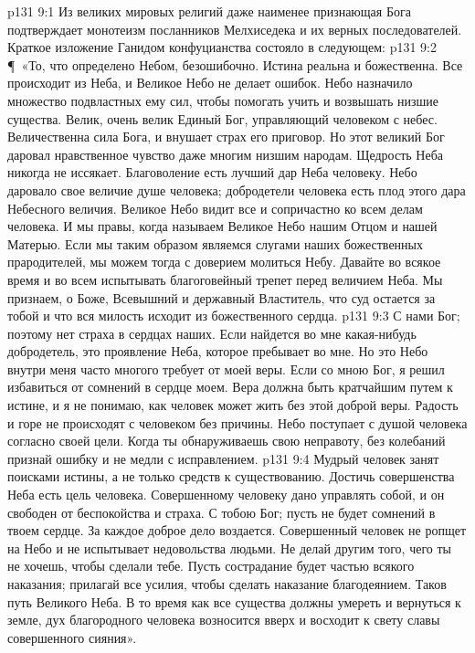 \vs p131 9:1 Из великих мировых религий даже наименее признающая Бога подтверждает монотеизм посланников Мелхиседека и их верных последователей. Краткое изложение Ганидом конфуцианства состояло в следующем:
\vs p131 9:2 \P\ «То, что определено Небом, безошибочно. Истина реальна и божественна. Все происходит из Неба, и Великое Небо не делает ошибок. Небо назначило множество подвластных ему сил, чтобы помогать учить и возвышать низшие существа. Велик, очень велик Единый Бог, управляющий человеком с небес. Величественна сила Бога, и внушает страх его приговор. Но этот великий Бог даровал нравственное чувство даже многим низшим народам. Щедрость Неба никогда не иссякает. Благоволение есть лучший дар Неба человеку. Небо даровало свое величие душе человека; добродетели человека есть плод этого дара Небесного величия. Великое Небо видит все и сопричастно ко всем делам человека. И мы правы, когда называем Великое Небо нашим Отцом и нашей Матерью. Если мы таким образом являемся слугами наших божественных прародителей, мы можем тогда с доверием молиться Небу. Давайте во всякое время и во всем испытывать благоговейный трепет перед величием Неба. Мы признаем, о Боже, Всевышний и державный Властитель, что суд остается за тобой и что вся милость исходит из божественного сердца.
\vs p131 9:3 С нами Бог; поэтому нет страха в сердцах наших. Если найдется во мне какая\hyp{}нибудь добродетель, это проявление Неба, которое пребывает во мне. Но это Небо внутри меня часто многого требует от моей веры. Если со мною Бог, я решил избавиться от сомнений в сердце моем. Вера должна быть кратчайшим путем к истине, и я не понимаю, как человек может жить без этой доброй веры. Радость и горе не происходят с человеком без причины. Небо поступает с душой человека согласно своей цели. Когда ты обнаруживаешь свою неправоту, без колебаний признай ошибку и не медли с исправлением.
\vs p131 9:4 Мудрый человек занят поисками истины, а не только средств к существованию. Достичь совершенства Неба есть цель человека. Совершенному человеку дано управлять собой, и он свободен от беспокойства и страха. С тобою Бог; пусть не будет сомнений в твоем сердце. За каждое доброе дело воздается. Совершенный человек не ропщет на Небо и не испытывает недовольства людьми. Не делай другим того, чего ты не хочешь, чтобы сделали тебе. Пусть сострадание будет частью всякого наказания; прилагай все усилия, чтобы сделать наказание благодеянием. Таков путь Великого Неба. В то время как все существа должны умереть и вернуться к земле, дух благородного человека возносится вверх и восходит к свету славы совершенного сияния».
